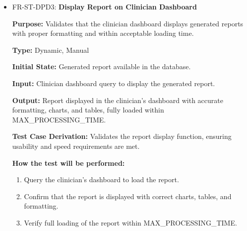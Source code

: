 \documentclass[12pt, titlepage]{article}
\begin{document}
\begin{itemize}
  \item FR-ST-DPD3: \textbf{Display Report on Clinician Dashboard}
  \begin{mdframed}[linewidth=0.5mm]
      \textbf{Purpose:} Validates that the clinician dashboard displays generated reports with proper formatting and within acceptable loading time. \par
      \textbf{Type:} Dynamic, Manual \par
      \textbf{Initial State:} Generated report available in the database. \par
      \textbf{Input:} Clinician dashboard query to display the generated report. \par
      \textbf{Output:} Report displayed in the clinician’s dashboard with accurate formatting, charts, and tables, fully loaded within MAX\_PROCESSING\_TIME. \par
      \textbf{Test Case Derivation:} Validates the report display function, ensuring usability and speed requirements are met. \par
      \textbf{How the test will be performed:}
      \begin{enumerate}[noitemsep]
        \item Query the clinician’s dashboard to load the report.
        \item Confirm that the report is displayed with correct charts, tables, and formatting.
        \item Verify full loading of the report within MAX\_PROCESSING\_TIME.
      \end{enumerate}
  \end{mdframed}


\end{itemize}
\end{document}

